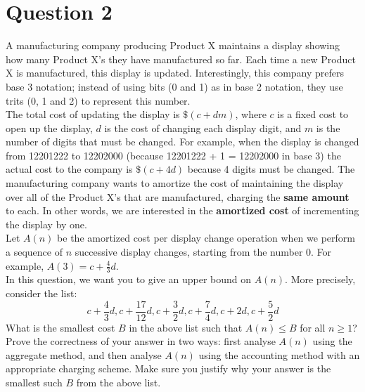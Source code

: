 \documentclass[11pt]{article}
\begin{document}
\section*{Question 2}
A manufacturing company producing Product X maintains a display showing how many Product X’s they have manufactured so far. Each time a new Product X is manufactured, this display is updated. Interestingly, this company prefers base 3 notation; instead of using bits (0 and 1) as in base 2 notation, they use trits (0, 1 and 2) to represent this number.\\
The total cost of updating the display is $\$(c + dm)$, where $c$ is a fixed cost to open up the display, $d$ is the cost of changing each display digit, and $m$ is the number of digits that must be changed. For example, when the display is changed from 12201222 to 12202000 (because 12201222 + 1 = 12202000 in base 3) the actual cost to the company is $\$(c + 4d)$ because 4 digits must be changed. The manufacturing company wants to amortize the cost of maintaining the display over all of the Product X’s that are manufactured, charging the \textbf{same amount} to each. In other words, we are interested in the \textbf{amortized cost} of incrementing the display by one.\\
Let $A(n)$ be the amortized cost per display change operation when we perform a sequence of $n$ successive display changes, starting from the number 0. For example, $A(3) = c +
\frac{4}{3}d$.\\
In this question, we want you to give an upper bound on $A(n)$. More precisely, consider the list:
\[
  c+ \frac{4}{3}d, c+ \frac{17}{12}d, c+ \frac{3}{2}d, c+ \frac{7}{4}d, c+2d, c+ \frac{5}{2}d
\]
What is the smallest cost $B$ in the above list such that $A(n) \leq B$ for all $n \geq 1$?\\
Prove the correctness of your answer in two ways: first analyse $A(n)$ using the aggregate method, and then
analyse $A(n)$ using the accounting method with an appropriate charging scheme. Make sure you justify why your answer is the smallest such $B$ from the above list.
\end{document}
